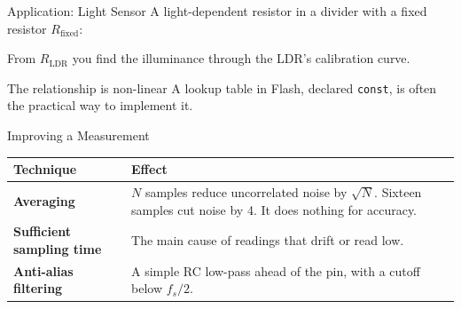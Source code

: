 \documentclass[9pt,aspectratio=169,xcolor=table]{beamer}
\begin{document}
\begin{frame}{Application: Light Sensor}
    \leavevmode
    A light-dependent resistor in a divider with a fixed resistor $R_{\text{fixed}}$:

    \vspace{2mm}
    \begin{center}
    \end{center}

    \vspace{3mm}
    {\small From $R_{\text{LDR}}$ you find the illuminance through the LDR's calibration curve.}

    \vspace{2mm}
    \begin{block}{The relationship is non-linear}
        A \alert{lookup table in Flash}, declared \texttt{const}, is often the practical way to implement it.
    \end{block}
\end{frame}

\begin{frame}{Improving a Measurement}
    \begin{center}
    {\small
    \striped
    \begin{tabular}{@{}l R{.62\textwidth}@{}}
        \toprule
        \textbf{Technique} & \textbf{Effect} \\
        \midrule
        \textbf{Averaging} & $N$ samples reduce uncorrelated noise by $\sqrt{N}$. Sixteen samples cut noise by 4. It does nothing for accuracy. \\
        \textbf{Sufficient sampling time} & The main cause of readings that drift or read low. \\
        \textbf{Anti-alias filtering} & A simple RC low-pass ahead of the pin, with a cutoff below $f_s/2$. \\
        \bottomrule
    \end{tabular}}
    \end{center}
\end{frame}
\end{document}
